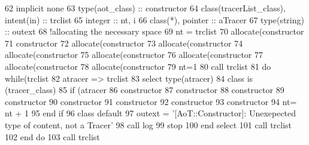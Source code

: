 \begin{DoxyCode}
62     \textcolor{keywordtype}{implicit none}
63     \textcolor{keywordtype}{type}(aot\_class) :: constructor
64     \textcolor{keywordtype}{class}(tracerList\_class), \textcolor{keywordtype}{intent(in)} :: trclist
65     \textcolor{keywordtype}{integer} :: nt, i
66     \textcolor{keywordtype}{class}(*), \textcolor{keywordtype}{pointer} :: aTracer
67     \textcolor{keywordtype}{type}(string) :: outext
68     \textcolor{comment}{!allocating the necessary space}
69     nt = trclist%
70     \textcolor{keyword}{allocate}(constructor%
71     constructor%
72     \textcolor{keyword}{allocate}(constructor%
73     \textcolor{keyword}{allocate}(constructor%
74     \textcolor{keyword}{allocate}(constructor%
75     \textcolor{keyword}{allocate}(constructor%
76     \textcolor{keyword}{allocate}(constructor%
77     \textcolor{keyword}{allocate}(constructor%
78     \textcolor{keyword}{allocate}(constructor%
79     nt=1
80     \textcolor{keyword}{call }trclist%
81     \textcolor{keywordflow}{do} \textcolor{keywordflow}{while}(trclist%
82         atracer => trclist%
83         \textcolor{keywordflow}{select type}(atracer)
84 \textcolor{keywordflow}{        class is} (tracer\_class)
85             \textcolor{keywordflow}{if} (atracer%
86                 constructor%
87                 constructor%
88                 constructor%
89                 constructor%
90                 constructor%
91                 constructor%
92                 constructor%
93                 constructor%
94                 nt= nt + 1
95 \textcolor{keywordflow}{            end if}
96 \textcolor{keywordflow}{            class default}
97             outext = \textcolor{stringliteral}{'[AoT::Constructor]: Unexepected type of content, not a Tracer'}
98             \textcolor{keyword}{call }log%
99             stop
100 \textcolor{keywordflow}{        end select}
101         \textcolor{keyword}{call }trclist%
102 \textcolor{keywordflow}{    end do}
103     \textcolor{keyword}{call }trclist%
\end{DoxyCode}
\mbox{\label{namespaceaot__mod_a4affda04a7a0278b350231db9cc4ffb8}} 
